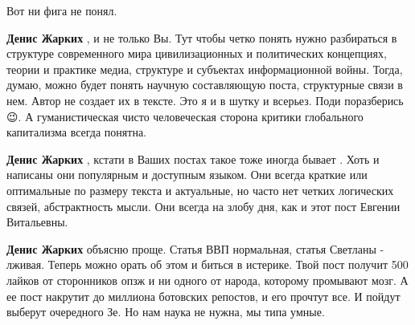 \begin{itemize}
Вот ни фига не понял.

\begin{itemize}
 
\textbf{Денис Жарких} , и не только Вы. Тут чтобы четко понять нужно
разбираться в структуре современного мира цивилизационных и политических
концепциях, теории и практике медиа, структуре и субъектах информационной
войны. Тогда, думаю, можно будет понять научную составляющую поста, структурные
связи в нем. Автор не создает их в тексте. Это я и в шутку и всерьез. Поди
поразберись 😉. А гуманистическая чисто человеческая сторона критики
глобального капитализма всегда понятна.

 
\textbf{Денис Жарких} , кстати в Ваших постах такое тоже иногда бывает . \Smiley[1.0][yellow]Хоть
и написаны они популярным и доступным языком. Они всегда краткие или
оптимальные по размеру текста и актуальные, но часто нет четких логических
связей, абстрактность мысли. Они всегда на злобу дня, как и этот пост Евгении
Витальевны.

 
\textbf{Денис Жарких} объясню проще. Статья ВВП нормальная, статья Светланы -
лживая. Теперь можно орать об этом и биться в истерике. Твой пост получит 500
лайков от сторонников опзж и ни одного от народа, которому промывают мозг. А ее
пост накрутит до миллиона ботовских репостов, и его прочтут все. И пойдут
выберут очередного Зе. Но нам наука не нужна, мы типа умные.

 

\end{itemize}
\end{itemize}
